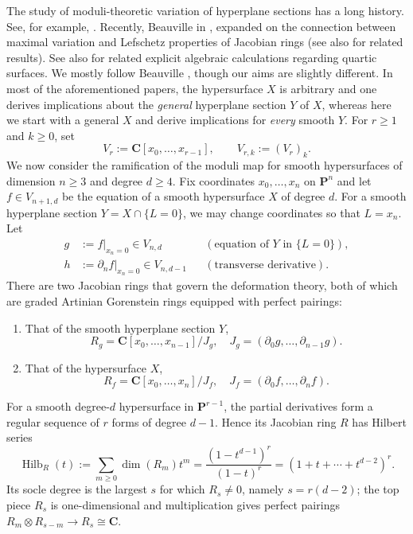\documentclass[a4paper,12pt,twoside,reqno]{amsart}
\numberwithin{equation}{section}
\theoremstyle{plain}
\theoremstyle{definition}
\newcommand{\PP}{\mathbf{P}}
\newcommand{\CC}{\mathbf{C}}
\theoremstyle{plain}
\theoremstyle{definition}
\begin{document}
The study of moduli-theoretic variation of hyperplane sections  has a long history. See, for example, \cite{HMP,VanOpstallVeliche,PatelRiedlTseng,bricalli2026maximalvariationproblemlefschetz}. Recently, Beauville in \cite{BE}, expanded on the connection between maximal variation and Lefschetz properties of Jacobian rings (see also  \cite{IlardiNasrollahTafazolian} for related results). See also \cite[Section~6.3]{Bertsch} for related explicit algebraic calculations regarding quartic surfaces. We mostly follow Beauville \cite{BE}, though our aims are slightly different. In most of the aforementioned papers, the hypersurface $X$ is arbitrary and one derives implications about the \textit{general} hyperplane section $Y$ of $X$, whereas here we start with a general $X$ and derive implications for \textit{every} smooth $Y$. For $r\ge1$ and $k\ge0$, set
\[
   V_r:=\CC[x_0,\dots,x_{r-1}],
   \qquad V_{r,k}:=(V_r)_k.
\]
We now consider the ramification of the moduli map for smooth hypersurfaces of dimension $n\geq3$ and degree $d\geq4$. Fix coordinates $x_0, \dots, x_n$ on $\PP^n$ and let $f \in V_{n+1,d}$ be the equation of a smooth hypersurface $X$ of degree $d$. For a smooth hyperplane section $Y = X \cap \{L=0\}$, we may change coordinates so that $L=x_n$. Let
\begin{align*}
   g&:=f|_{x_n=0}\in V_{n,d} && (\text{equation of } Y \text{ in } \{L=0\}),\\
   h&:=\partial_n f|_{x_n=0}\in V_{n,d-1} && (\text{transverse derivative}).
\end{align*}
There are two Jacobian rings that govern the deformation theory, both of which are graded Artinian Gorenstein rings equipped with perfect pairings:
\begin{enumerate}
    \item That of the smooth hyperplane section $Y$,
    \[
        R_{g} = \CC[x_0, \dots, x_{n-1}] / J_{g}, \quad J_{g} = (\partial_0 g, \dots, \partial_{n-1} g).
    \]
    \item That of the hypersurface $X$,
    \[ 
        R_f = \CC[x_0, \dots, x_n] / J_f, \quad J_f = (\partial_0 f, \dots, \partial_n f).
    \]
\end{enumerate}

For a smooth degree-$d$ hypersurface in $\PP^{r-1}$, the partial derivatives form a regular sequence of $r$ forms of degree $d-1$. Hence its Jacobian ring $R$ has Hilbert series
\[
\operatorname{Hilb}_R(t)
:=\sum_{m\ge0}\dim(R_m)t^m
=\frac{(1-t^{d-1})^r}{(1-t)^r}
=(1+t+\cdots+t^{d-2})^r.
\]
Its socle degree is the largest $s$ for which $R_s\neq0$, namely $s=r(d-2)$; the top piece $R_s$ is one-dimensional and multiplication gives perfect pairings $R_m\otimes R_{s-m}\to R_s\cong\CC$.
\end{document}
